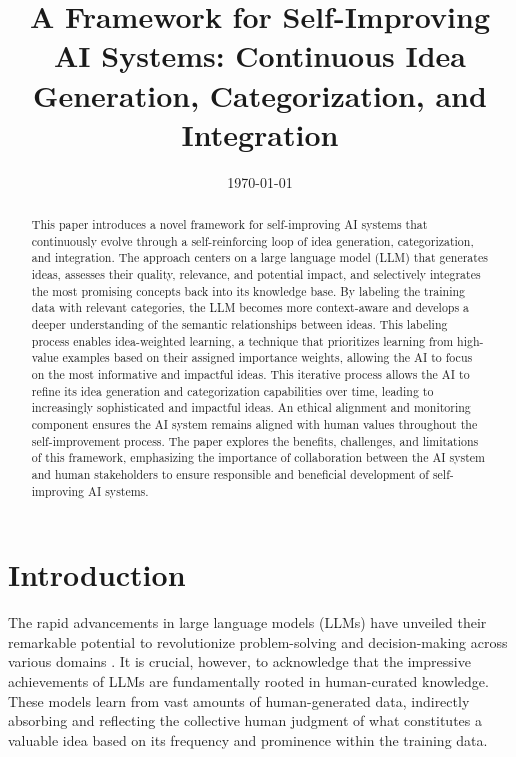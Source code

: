 \documentclass[conference]{article}
\title{A Framework for Self-Improving AI Systems: Continuous Idea Generation, Categorization, and Integration}
\author{
	\IEEEauthorblockN{Transitory System}
	\IEEEauthorblockA{
		Independent Researcher\\
		transitory\_system@protonmail.com \\
		\today
	}
}
\date{\today}
\begin{document}
	
	\maketitle
	
	\begin{abstract}
		This paper introduces a novel framework for self-improving AI systems that continuously evolve through a self-reinforcing loop of idea generation, categorization, and integration. The approach centers on a large language model (LLM) that generates ideas, assesses their quality, relevance, and potential impact, and selectively integrates the most promising concepts back into its knowledge base. By labeling the training data with relevant categories, the LLM becomes more context-aware and develops a deeper understanding of the semantic relationships between ideas. This labeling process enables idea-weighted learning, a technique that prioritizes learning from high-value examples based on their assigned importance weights, allowing the AI to focus on the most informative and impactful ideas. This iterative process allows the AI to refine its idea generation and categorization capabilities over time, leading to increasingly sophisticated and impactful ideas. An ethical alignment and monitoring component ensures the AI system remains aligned with human values throughout the self-improvement process. The paper explores the benefits, challenges, and limitations of this framework, emphasizing the importance of collaboration between the AI system and human stakeholders to ensure responsible and beneficial development of self-improving AI systems.
	\end{abstract}
	
	\section{Introduction}
	
	
	The rapid advancements in large language models (LLMs) have unveiled their remarkable potential to revolutionize problem-solving and decision-making across various domains \cite{brown2020language, bommasani2021opportunities}. It is crucial, however, to acknowledge that the impressive achievements of LLMs are fundamentally rooted in human-curated knowledge. These models learn from vast amounts of human-generated data, indirectly absorbing and reflecting the collective human judgment of what constitutes a valuable idea based on its frequency and prominence within the training data.
	
\end{document}
